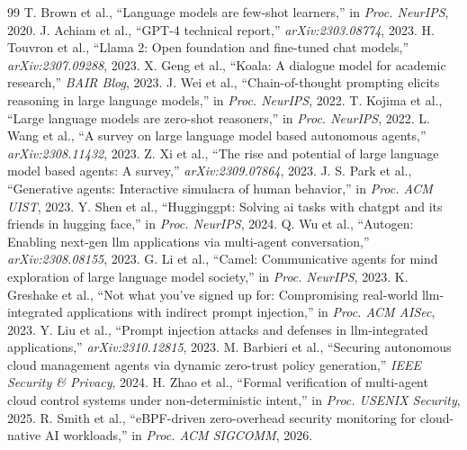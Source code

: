 \documentclass[conference]{IEEEtran}
\begin{document}
\begin{thebibliography}{99}
 T. Brown et al., ``Language models are few-shot learners,'' in \textit{Proc. NeurIPS}, 2020.
 J. Achiam et al., ``GPT-4 technical report,'' \textit{arXiv:2303.08774}, 2023.
 H. Touvron et al., ``Llama 2: Open foundation and fine-tuned chat models,'' \textit{arXiv:2307.09288}, 2023.
 X. Geng et al., ``Koala: A dialogue model for academic research,'' \textit{BAIR Blog}, 2023.
 J. Wei et al., ``Chain-of-thought prompting elicits reasoning in large language models,'' in \textit{Proc. NeurIPS}, 2022.
 T. Kojima et al., ``Large language models are zero-shot reasoners,'' in \textit{Proc. NeurIPS}, 2022.
 L. Wang et al., ``A survey on large language model based autonomous agents,'' \textit{arXiv:2308.11432}, 2023.
 Z. Xi et al., ``The rise and potential of large language model based agents: A survey,'' \textit{arXiv:2309.07864}, 2023.
 J. S. Park et al., ``Generative agents: Interactive simulacra of human behavior,'' in \textit{Proc. ACM UIST}, 2023.
 Y. Shen et al., ``Hugginggpt: Solving ai tasks with chatgpt and its friends in hugging face,'' in \textit{Proc. NeurIPS}, 2024.
 Q. Wu et al., ``Autogen: Enabling next-gen llm applications via multi-agent conversation,'' \textit{arXiv:2308.08155}, 2023.
 G. Li et al., ``Camel: Communicative agents for mind exploration of large language model society,'' in \textit{Proc. NeurIPS}, 2023.
 K. Greshake et al., ``Not what you've signed up for: Compromising real-world llm-integrated applications with indirect prompt injection,'' in \textit{Proc. ACM AISec}, 2023.
 Y. Liu et al., ``Prompt injection attacks and defenses in llm-integrated applications,'' \textit{arXiv:2310.12815}, 2023.
 M. Barbieri et al., ``Securing autonomous cloud management agents via dynamic zero-trust policy generation,'' \textit{IEEE Security \& Privacy}, 2024.
 H. Zhao et al., ``Formal verification of multi-agent cloud control systems under non-deterministic intent,'' in \textit{Proc. USENIX Security}, 2025.
 R. Smith et al., ``eBPF-driven zero-overhead security monitoring for cloud-native AI workloads,'' in \textit{Proc. ACM SIGCOMM}, 2026.
\end{thebibliography}
\end{document}
